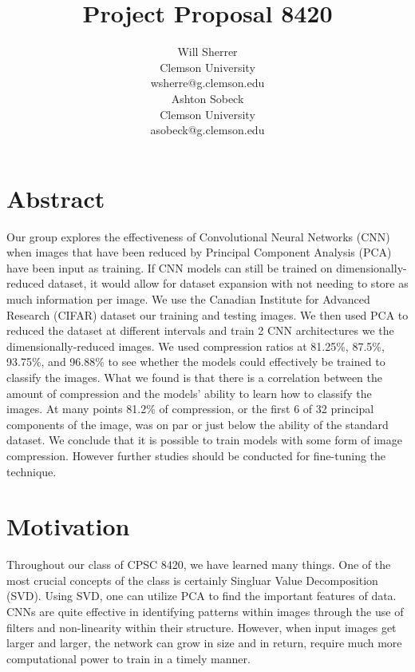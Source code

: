 \documentclass{article}
\title{Project Proposal 8420}
\author{%
	Will Sherrer \\
	Clemson University\\
	wsherre@g.clemson.edu \\
	\And Ashton Sobeck \\
	Clemson University\\
	asobeck@g.clemson.edu
}
\begin{document}
\maketitle
\section{Abstract} 

Our group explores the effectiveness of Convolutional Neural Networks (CNN) when  images that have been reduced by Principal Component Analysis (PCA) have been input as training. If CNN models can still be trained on dimensionally-reduced dataset, it would allow for dataset expansion with not needing to store as much information per image. We use the Canadian Institute for Advanced Research (CIFAR) dataset our training and testing images. We then used PCA to reduced the dataset at different intervals and train 2 CNN architectures we the dimensionally-reduced images. We used compression ratios at 81.25\%, 87.5\%, 93.75\%, and 96.88\% to see whether the models could effectively be trained to classify the images. What we found is that there is a correlation between the amount of compression and the models' ability to learn how to classify the images. At many points 81.2\% of compression, or the first 6 of 32 principal components of the image, was on par or just below the ability of the standard dataset. We conclude that it is possible to train models with some form of image compression. However further studies should be conducted for fine-tuning the technique. 

\section{Motivation}

Throughout our class of CPSC 8420, we have learned many things. 
One of the most crucial concepts of the class is certainly Singluar Value 
Decomposition (SVD). Using SVD, one can utilize PCA to find the important 
features of data. CNNs are quite effective in identifying patterns within 
images through the use of filters and non-linearity within their structure. 
However, when input images get larger and larger, the network can grow in 
size and in return, require much more computational power to train in a timely manner.
\end{document}
